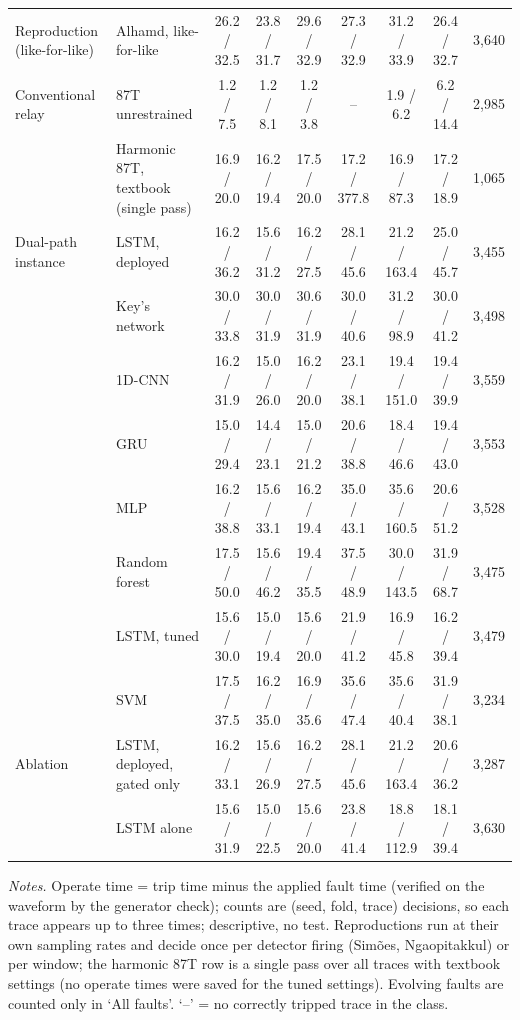 \begin{table}[!htbp]
{\begin{tabular}{@{}llccccccr@{}}
\addlinespace
Reproduction (like-for-like) & Alhamd, like-for-like & 26.2 / 32.5 & 23.8 / 31.7 & 29.6 / 32.9 & 27.3 / 32.9 & 31.2 / 33.9 & 26.4 / 32.7 & 3{,}640 \\
\addlinespace
Conventional relay & 87T unrestrained & 1.2 / 7.5 & 1.2 / 8.1 & 1.2 / 3.8 & -- & 1.9 / 6.2 & 6.2 / 14.4 & 2{,}985 \\
 & Harmonic 87T, textbook (single pass) & 16.9 / 20.0 & 16.2 / 19.4 & 17.5 / 20.0 & 17.2 / 377.8 & 16.9 / 87.3 & 17.2 / 18.9 & 1{,}065 \\
\addlinespace
Dual-path instance & LSTM, deployed & 16.2 / 36.2 & 15.6 / 31.2 & 16.2 / 27.5 & 28.1 / 45.6 & 21.2 / 163.4 & 25.0 / 45.7 & 3{,}455 \\
 & Key's network & 30.0 / 33.8 & 30.0 / 31.9 & 30.6 / 31.9 & 30.0 / 40.6 & 31.2 / 98.9 & 30.0 / 41.2 & 3{,}498 \\
 & 1D-CNN & 16.2 / 31.9 & 15.0 / 26.0 & 16.2 / 20.0 & 23.1 / 38.1 & 19.4 / 151.0 & 19.4 / 39.9 & 3{,}559 \\
 & GRU & 15.0 / 29.4 & 14.4 / 23.1 & 15.0 / 21.2 & 20.6 / 38.8 & 18.4 / 46.6 & 19.4 / 43.0 & 3{,}553 \\
 & MLP & 16.2 / 38.8 & 15.6 / 33.1 & 16.2 / 19.4 & 35.0 / 43.1 & 35.6 / 160.5 & 20.6 / 51.2 & 3{,}528 \\
 & Random forest & 17.5 / 50.0 & 15.6 / 46.2 & 19.4 / 35.5 & 37.5 / 48.9 & 30.0 / 143.5 & 31.9 / 68.7 & 3{,}475 \\
 & LSTM, tuned & 15.6 / 30.0 & 15.0 / 19.4 & 15.6 / 20.0 & 21.9 / 41.2 & 16.9 / 45.8 & 16.2 / 39.4 & 3{,}479 \\
 & SVM & 17.5 / 37.5 & 16.2 / 35.0 & 16.9 / 35.6 & 35.6 / 47.4 & 35.6 / 40.4 & 31.9 / 38.1 & 3{,}234 \\
\addlinespace
Ablation & LSTM, deployed, gated only & 16.2 / 33.1 & 15.6 / 26.9 & 16.2 / 27.5 & 28.1 / 45.6 & 21.2 / 163.4 & 20.6 / 36.2 & 3{,}287 \\
 & LSTM alone & 15.6 / 31.9 & 15.0 / 22.5 & 15.6 / 20.0 & 23.8 / 41.4 & 18.8 / 112.9 & 18.1 / 39.4 & 3{,}630 \\
\bottomrule\end{tabular}}
\vspace{3pt}\par\raggedright\scriptsize\textit{Notes.} Operate time = trip time minus the applied fault time (verified on the waveform by the generator check); counts are (seed, fold, trace) decisions, so each trace appears up to three times; descriptive, no test. Reproductions run at their own sampling rates and decide once per detector firing (Sim\~oes, Ngaopitakkul) or per window; the harmonic 87T row is a single pass over all traces with textbook settings (no operate times were saved for the tuned settings). Evolving faults are counted only in `All faults'. `--' = no correctly tripped trace in the class.
\end{table}
